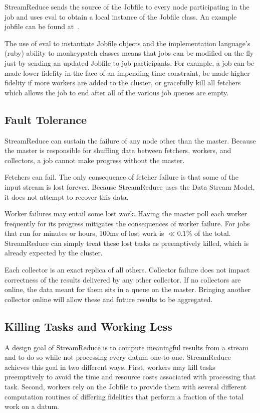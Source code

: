 \documentclass[12pt,twocolumn]{article}
\begin{document}
StreamReduce sends the source of the Jobfile to every node participating in the job and uses eval to
obtain a local instance of the Jobfile class. An example jobfile can be found at~\cite{github}.

The use of eval to instantiate Jobfile objects and the implementation language's (ruby)
ability to monkeypatch classes means that jobs can be modified on the fly just by sending
an updated Jobfile to job participants. For example, a job can be made lower fidelity in
the face of an impending time constraint, be made higher fidelity if more workers are added to
the cluster, or gracefully kill all fetchers which allows the job to end after all of the
various job queues are empty.
\subsection{Fault Tolerance}
StreamReduce can sustain the failure of any node other than the master. Because the master is responsible
for shuffling data between fetchers, workers, and collectors, a job cannot make progress without
the master.

Fetchers can fail. The only consequence of fetcher failure is that some of the input stream is
lost forever. Because StreamReduce uses the Data Stream Model, it does not attempt to recover this data.

Worker failures may entail some lost work. Having the master poll each worker frequently for its
progress mitigates the consequences of worker failure. For jobs that run for minutes or hours,
100ms of lost work is $\ll0.1\%$ of the total. StreamReduce can simply treat these lost tasks as preemptively
killed, which is already expected by the cluster.

Each collector is an exact replica of all others. Collector failure does not impact correctness of
the results delivered by any other collector. If no collectors are online, the data meant for them
sits in a queue on the master. Bringing another collector online will allow these and future results
to be aggregated.
\subsection{Killing Tasks and Working Less}
A design goal of StreamReduce is to compute meaningful results from a stream and to do so while not
processing every datum one-to-one. StreamReduce achieves this goal in two different ways. First, workers
may kill tasks preemptively to avoid the time and resource costs associated with processing
that task. Second, workers rely on the Jobfile to provide them with several different
computation routines of differing fidelities that perform a fraction of the total work on a
datum.
\end{document}
